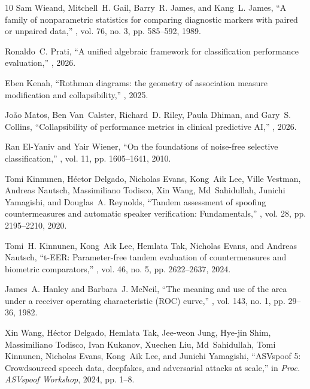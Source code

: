 \documentclass{article}
\begin{document}
\begin{thebibliography}{10}
Sam Wieand, Mitchell~H. Gail, Barry~R. James, and Kang~L. James,
\newblock ``A family of nonparametric statistics for comparing diagnostic markers with paired or unpaired data,''
, vol. 76, no. 3, pp. 585--592, 1989.

Ronaldo~C. Prati,
\newblock ``A unified algebraic framework for classification performance evaluation,''
, 2026.

Eben Kenah,
\newblock ``Rothman diagrams: the geometry of association measure modification and collapsibility,''
, 2025.

Jo\~{a}o Matos, Ben Van~Calster, Richard~D. Riley, Paula Dhiman, and Gary~S. Collins,
\newblock ``Collapsibility of performance metrics in clinical predictive {AI},''
, 2026.

Ran El-Yaniv and Yair Wiener,
\newblock ``On the foundations of noise-free selective classification,''
, vol. 11, pp. 1605--1641, 2010.

Tomi Kinnunen, H\'{e}ctor Delgado, Nicholas Evans, Kong~Aik Lee, Ville Vestman, Andreas Nautsch, Massimiliano Todisco, Xin Wang, Md~Sahidullah, Junichi Yamagishi, and Douglas~A. Reynolds,
\newblock ``Tandem assessment of spoofing countermeasures and automatic speaker verification: Fundamentals,''
, vol. 28, pp. 2195--2210, 2020.

Tomi~H. Kinnunen, Kong~Aik Lee, Hemlata Tak, Nicholas Evans, and Andreas Nautsch,
\newblock ``{t-EER}: Parameter-free tandem evaluation of countermeasures and biometric comparators,''
, vol. 46, no. 5, pp. 2622--2637, 2024.

James~A. Hanley and Barbara~J. McNeil,
\newblock ``The meaning and use of the area under a receiver operating characteristic ({ROC}) curve,''
, vol. 143, no. 1, pp. 29--36, 1982.

Xin Wang, H\'{e}ctor Delgado, Hemlata Tak, Jee-weon Jung, Hye-jin Shim, Massimiliano Todisco, Ivan Kukanov, Xuechen Liu, Md~Sahidullah, Tomi Kinnunen, Nicholas Evans, Kong~Aik Lee, and Junichi Yamagishi,
\newblock ``{ASVspoof} 5: Crowdsourced speech data, deepfakes, and adversarial attacks at scale,''
\newblock in {\em Proc. ASVspoof Workshop}, 2024, pp. 1--8.


\end{thebibliography}
\end{document}
